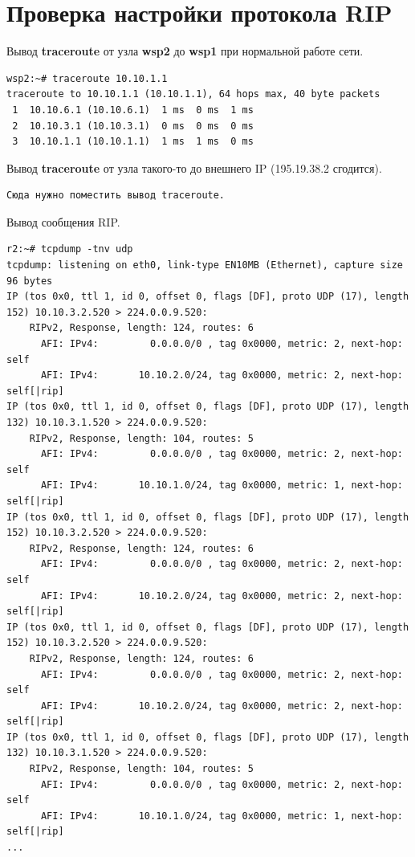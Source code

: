 \documentclass[a4paper,12pt]{article}
\begin{document}
\section{Проверка настройки протокола RIP}

Вывод \textbf{traceroute} от узла \textbf{wsp2} до \textbf{wsp1} при нормальной работе сети.

\begin{Verbatim}
wsp2:~# traceroute 10.10.1.1
traceroute to 10.10.1.1 (10.10.1.1), 64 hops max, 40 byte packets
 1  10.10.6.1 (10.10.6.1)  1 ms  0 ms  1 ms
 2  10.10.3.1 (10.10.3.1)  0 ms  0 ms  0 ms
 3  10.10.1.1 (10.10.1.1)  1 ms  1 ms  0 ms
\end{Verbatim}

Вывод \textbf{traceroute} от узла такого-то до внешнего IP (195.19.38.2 сгодится).

\begin{Verbatim}
Сюда нужно поместить вывод traceroute.
\end{Verbatim}

Вывод сообщения RIP.

\begin{Verbatim}
r2:~# tcpdump -tnv udp
tcpdump: listening on eth0, link-type EN10MB (Ethernet), capture size 96 bytes
IP (tos 0x0, ttl 1, id 0, offset 0, flags [DF], proto UDP (17), length 152) 10.10.3.2.520 > 224.0.0.9.520: 
	RIPv2, Response, length: 124, routes: 6
	  AFI: IPv4:         0.0.0.0/0 , tag 0x0000, metric: 2, next-hop: self
	  AFI: IPv4:       10.10.2.0/24, tag 0x0000, metric: 2, next-hop: self[|rip]
IP (tos 0x0, ttl 1, id 0, offset 0, flags [DF], proto UDP (17), length 132) 10.10.3.1.520 > 224.0.0.9.520: 
	RIPv2, Response, length: 104, routes: 5
	  AFI: IPv4:         0.0.0.0/0 , tag 0x0000, metric: 2, next-hop: self
	  AFI: IPv4:       10.10.1.0/24, tag 0x0000, metric: 1, next-hop: self[|rip]
IP (tos 0x0, ttl 1, id 0, offset 0, flags [DF], proto UDP (17), length 152) 10.10.3.2.520 > 224.0.0.9.520: 
	RIPv2, Response, length: 124, routes: 6
	  AFI: IPv4:         0.0.0.0/0 , tag 0x0000, metric: 2, next-hop: self
	  AFI: IPv4:       10.10.2.0/24, tag 0x0000, metric: 2, next-hop: self[|rip]
IP (tos 0x0, ttl 1, id 0, offset 0, flags [DF], proto UDP (17), length 152) 10.10.3.2.520 > 224.0.0.9.520: 
	RIPv2, Response, length: 124, routes: 6
	  AFI: IPv4:         0.0.0.0/0 , tag 0x0000, metric: 2, next-hop: self
	  AFI: IPv4:       10.10.2.0/24, tag 0x0000, metric: 2, next-hop: self[|rip]
IP (tos 0x0, ttl 1, id 0, offset 0, flags [DF], proto UDP (17), length 132) 10.10.3.1.520 > 224.0.0.9.520: 
	RIPv2, Response, length: 104, routes: 5
	  AFI: IPv4:         0.0.0.0/0 , tag 0x0000, metric: 2, next-hop: self
	  AFI: IPv4:       10.10.1.0/24, tag 0x0000, metric: 1, next-hop: self[|rip]
...
\end{Verbatim}
\end{document}
